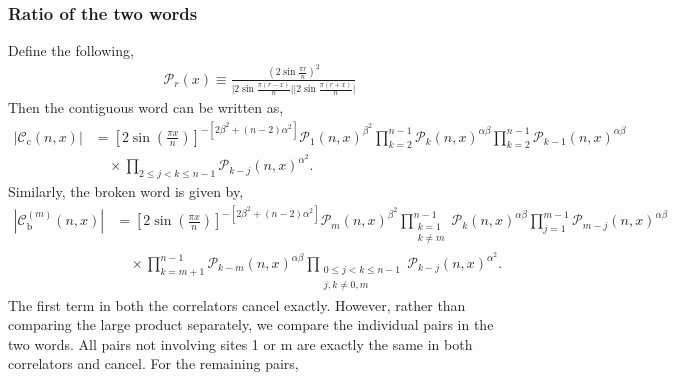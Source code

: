 \documentclass[11pt]{article}
\newcommand{\nn}{\nonumber}
\newcommand{\lb}{\left(}
\newcommand{\rb}{\right)}
\begin{document}
\subsubsection{Ratio of the two words}
Define the following,
\begin{align}
    \mathcal{P}_r(x) \equiv \frac{\lb 2 \sin \frac{\pi r}{n}\rb^2}{\big|2\sin \frac{\pi(r-x)}{n}\big| \big|2\sin \frac{\pi(r+x)}{n}\big|}
\end{align}
Then the contiguous word can be written as,
\begin{align}
\left|\mathcal{C}_{\mathrm c}(n,x)\right|
&=
\left[
2\sin\left(\frac{\pi x}{n}\right)
\right]^{-\left[2\beta^2+(n-2)\alpha^2\right]}
\mathcal{P}_{1}(n,x)^{\beta^2}
\prod_{k=2}^{n-1}
\mathcal{P}_{k}(n,x)^{\alpha\beta}
\prod_{k=2}^{n-1}
\mathcal{P}_{k-1}(n,x)^{\alpha\beta}
\nonumber\\
&\quad\times
\prod_{2\leq j<k\leq n-1}
\mathcal{P}_{k-j}(n,x)^{\alpha^2}.
\end{align}
Similarly, the broken word is given by,
\begin{align}
\left|\mathcal{C}_{\mathrm b}^{(m)}(n,x)\right|
&=
\left[
2\sin\left(\frac{\pi x}{n}\right)
\right]^{-\left[2\beta^2+(n-2)\alpha^2\right]}
\mathcal{P}_{m}(n,x)^{\beta^2}
\prod_{\substack{k=1\\ k\neq m}}^{n-1}
\mathcal{P}_{k}(n,x)^{\alpha\beta}
\prod_{j=1}^{m-1}
\mathcal{P}_{m-j}(n,x)^{\alpha\beta}
\nn\\
&\quad\times
\prod_{k=m+1}^{n-1}
\mathcal{P}_{k-m}(n,x)^{\alpha\beta}
\prod_{\substack{0\leq j<k\leq n-1\\
                  j,k\neq 0,m}}
\mathcal{P}_{k-j}(n,x)^{\alpha^2}.
\end{align}
The first term in both the correlators cancel exactly. However, rather than comparing the large product separately, we compare the individual pairs in the two words. All pairs not involving sites 1 or m are exactly the same in both correlators and cancel. For the remaining pairs,
\end{document}

